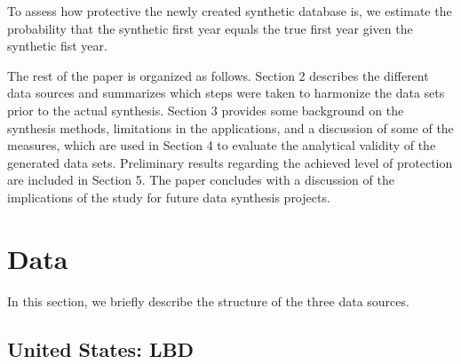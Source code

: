 \documentclass[10pt,twoside]{article}
\begin{document}
To assess how protective the newly created synthetic database is, we estimate the probability that the synthetic first year equals the true first year given the synthetic fist year.



The rest of the paper is organized as follows. Section 2 describes the different data sources and summarizes which steps were taken to harmonize the data sets prior to the actual synthesis. Section 3 provides some background on the synthesis methods, limitations in the applications, and a discussion of some of the measures, which are used in Section 4 to evaluate the analytical validity of the generated data sets. Preliminary results regarding the achieved level of protection are included in Section 5. The paper concludes with a discussion of the implications of the study for future data synthesis projects.
 \newpage
\section{Data} 
\label{sec:data}

In this section, we briefly describe the structure of the three data sources.

\subsection{United States: \acf{LBD}}
\end{document}
